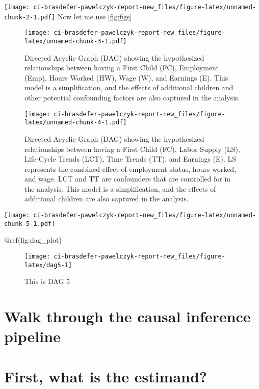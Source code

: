\documentclass[
]{article}
\begin{document}
\texttt{[image: ci-brasdefer-pawelczyk-report-new\_files/figure-latex/unnamed-chunk-2-1.pdf]}
Now let me use \ref{fig:figs}

\begin{figure}
\centering
\texttt{[image: ci-brasdefer-pawelczyk-report-new\_files/figure-latex/unnamed-chunk-3-1.pdf]}
\caption{Directed Acyclic Graph (DAG) showing the hypothesized
relationships between having a First Child (FC), Employment (Emp), Hours
Worked (HW), Wage (W), and Earnings (E). This model is a simplification,
and the effects of additional children and other potential confounding
factors are also captured in the analysis.}
\end{figure}

\begin{figure}
\centering
\texttt{[image: ci-brasdefer-pawelczyk-report-new\_files/figure-latex/unnamed-chunk-4-1.pdf]}
\caption{Directed Acyclic Graph (DAG) showing the hypothesized
relationships between having a First Child (FC), Labor Supply (LS),
Life-Cycle Trends (LCT), Time Trends (TT), and Earnings (E). LS
represents the combined effect of employment status, hours worked, and
wage. LCT and TT are confounders that are controlled for in the
analysis. This model is a simplification, and the effects of additional
children are also captured in the analysis.}
\end{figure}

\texttt{[image: ci-brasdefer-pawelczyk-report-new\_files/figure-latex/unnamed-chunk-5-1.pdf]}

@ref(fig:dag\_plot)

\begin{figure}

{\centering \texttt{[image: ci-brasdefer-pawelczyk-report-new\_files/figure-latex/dag5-1]} 

}

\caption{This is DAG 5}\label{fig:dag5}
\end{figure}

\hypertarget{walk-through-the-causal-inference-pipeline}{%
\section{Walk through the causal inference
pipeline}\label{walk-through-the-causal-inference-pipeline}}

\hypertarget{first-what-is-the-estimand}{%
\section{First, what is the
estimand?}\label{first-what-is-the-estimand}}
\end{document}
